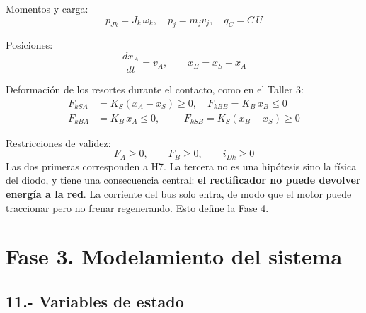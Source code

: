\documentclass[10pt,a4paper,twocolumn]{article}
\begin{document}
\noindent Momentos y carga:
\[
  p_{Jk} = J_k\,\omega_k, \quad p_j = m_j v_j, \quad q_C = C\,U
\]

\noindent Posiciones:
\[
  \frac{dx_A}{dt} = v_A, \qquad x_B = x_S - x_A
\]

\noindent Deformación de los resortes durante el contacto, como en el Taller 3:
\begin{align*}
  F_{kSA} &= K_S(x_A - x_S) \ge 0, \quad F_{kBB} = K_B\,x_B \le 0 \\
  F_{kBA} &= K_B\,x_A \le 0, \qquad\ \, F_{kSB} = K_S(x_B - x_S) \ge 0
\end{align*}

\noindent Restricciones de validez:
\[
  F_A \ge 0, \qquad F_B \ge 0, \qquad i_{Dk} \ge 0
\]
Las dos primeras corresponden a H7. La tercera no es una hipótesis sino la física del
diodo, y tiene una consecuencia central: \textbf{el rectificador no puede devolver energía
a la red}. La corriente del bus solo entra, de modo que el motor puede traccionar pero no
frenar regenerando. Esto define la Fase 4.

\section*{Fase 3. Modelamiento del sistema}

\subsection*{11.- Variables de estado}
\end{document}
